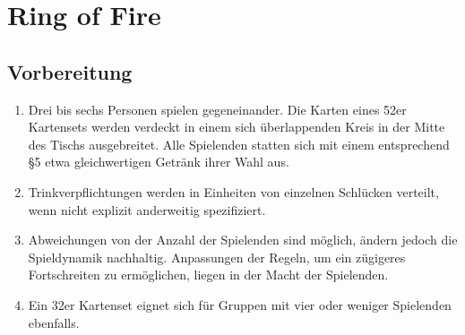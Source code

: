 \chapter{Ring of Fire}
\section{Vorbereitung}
\begin{enumerate}[label={(\arabic*)}]
	\item
	Drei bis sechs Personen spielen gegeneinander. Die Karten eines 52er Kartensets werden verdeckt in einem sich überlappenden Kreis in der Mitte des Tischs ausgebreitet. Alle Spielenden statten sich mit einem entsprechend §5 etwa gleichwertigen Getränk ihrer Wahl aus.

	\item
	Trinkverpflichtungen werden in Einheiten von einzelnen Schlücken verteilt, wenn nicht explizit anderweitig spezifiziert.

	\item
	Abweichungen von der Anzahl der Spielenden sind möglich, ändern jedoch die Spieldynamik nachhaltig. Anpassungen der Regeln, um ein zügigeres Fortschreiten zu ermöglichen, liegen in der Macht der Spielenden.

	\item
	Ein 32er Kartenset eignet sich für Gruppen mit vier oder weniger Spielenden ebenfalls.
\end{enumerate}

